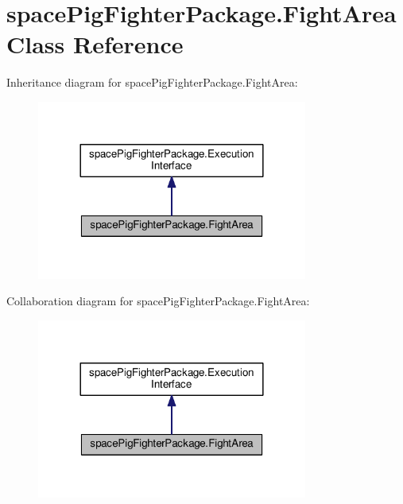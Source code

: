 \hypertarget{classspace_pig_fighter_package_1_1_fight_area}{}\section{space\+Pig\+Fighter\+Package.\+Fight\+Area Class Reference}
\label{classspace_pig_fighter_package_1_1_fight_area}


Inheritance diagram for space\+Pig\+Fighter\+Package.\+Fight\+Area\+:\nopagebreak
\begin{figure}[H]
\begin{center}
\leavevmode
\includegraphics[width=252pt]{classspace_pig_fighter_package_1_1_fight_area__inherit__graph}
\end{center}
\end{figure}


Collaboration diagram for space\+Pig\+Fighter\+Package.\+Fight\+Area\+:\nopagebreak
\begin{figure}[H]
\begin{center}
\leavevmode
\includegraphics[width=252pt]{classspace_pig_fighter_package_1_1_fight_area__coll__graph}
\end{center}
\end{figure}
